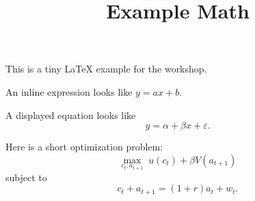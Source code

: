 \documentclass[11pt]{article}
\title{Example Math}
\author{}
\date{}
\begin{document}
\maketitle

This is a tiny LaTeX example for the workshop.

An inline expression looks like $y = ax + b$.

A displayed equation looks like
\[
  y = \alpha + \beta x + \varepsilon.
\]

Here is a short optimization problem:
\[
  \max_{c_t, a_{t+1}} \; u(c_t) + \beta V(a_{t+1})
\]
subject to
\[
  c_t + a_{t+1} = (1+r)a_t + w_t.
\]
\end{document}
